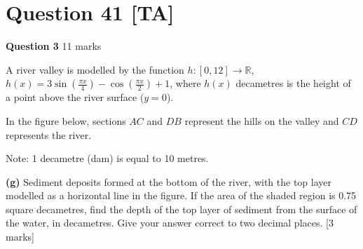 \documentclass[10pt,a4paper]{article}
\begin{document}
\vspace{9\baselineskip}

\hrulefill

\section*{Question 41 [TA]}

\textbf{Question 3} \hfill 11 marks

A river valley is modelled by the function $h : [0,12] \to \mathbb{R}$, $h(x) = 3\sin\left(\frac{\pi x}{4}\right) - \cos\left(\frac{\pi x}{2}\right) + 1$, where $h(x)$ decametres is the height of a point above the river surface ($y = 0$).

In the figure below, sections $AC$ and $DB$ represent the hills on the valley and $CD$ represents the river.

\begin{center}
\end{center}

Note: 1 decametre (dam) is equal to 10 metres.

\textbf{(g)} Sediment deposits formed at the bottom of the river, with the top layer modelled as a horizontal line in the figure. If the area of the shaded region is 0.75 square decametres, find the depth of the top layer of sediment from the surface of the water, in decametres. Give your answer correct to two decimal places. \hfill [3 marks]

\vspace{9\baselineskip}
\end{document}
